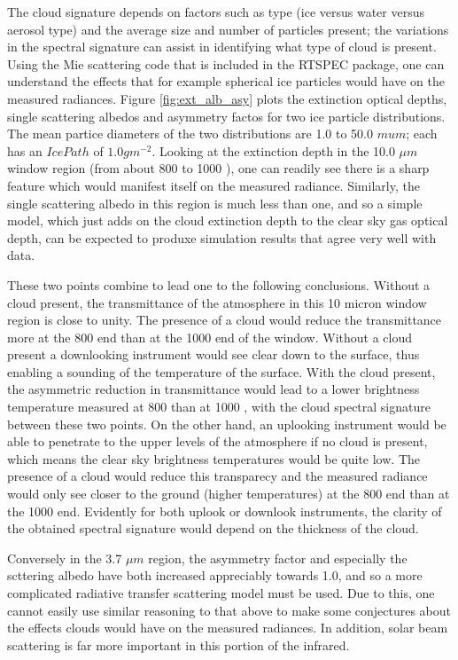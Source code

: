 \documentclass[11pt]{article}
\begin{document}
The cloud signature depends on factors such as type (ice versus water versus
aerosol type) and the average size and number of particles present; the 
variations in the spectral signature can assist in identifying what type 
of cloud is present. Using the Mie scattering code that is included in the 
\textsf{RTSPEC} package, one can understand the effects that for example 
spherical ice particles would have on the measured radiances. 
Figure \ref{fig:ext_alb_asy} plots the extinction 
optical depths, single scattering albedos and asymmetry factos for two 
ice particle distributions. The mean partice diameters of the two 
distributions are 1.0 to 50.0 $mu m$;  each has an $IcePath$ of 
$1.0 g m^{-2}$. Looking at the extinction depth in the 10.0 $\mu m$ window
region (from about 800 to 1000 \wn), one can readily see there is a sharp 
feature which would manifest itself on the measured radiance. Similarly, the 
single scattering albedo in this region is much less than one, and so a 
simple model, which just adds on the cloud extinction depth to the clear sky 
gas optical depth, can be expected to produxe simulation results that agree 
very well with data.  

These two points combine to lead one to the following conclusions. Without a 
cloud present, the transmittance of the atmosphere in this 10 micron window
region is close to unity. The presence of a cloud would reduce the 
transmittance more at the 800 \wn end than at the 1000 \wn end of the window.
Without a cloud present a downlooking instrument would see clear down to 
the surface, thus enabling a sounding of the temperature of the surface. With
the cloud present, the asymmetric reduction in transmittance would lead to a
lower brightness temperature measured at 800 \wn than at 1000 \wn, with the
cloud spectral signature between these two points. On the other hand, an
uplooking instrument would be able to penetrate to the upper levels of the
atmosphere if no cloud is present, which means the clear sky brightness 
temperatures would be quite low. The presence of a cloud would reduce this
transparecy and the measured radiance would only see closer to the ground 
(higher temperatures) at the 800 \wn end than at the 1000 \wn end. Evidently 
for both uplook or downlook instruments, the clarity of the obtained 
spectral signature would depend on the thickness of the cloud.

Conversely in the 3.7 $\mu m$ region, the asymmetry factor and especially 
the scttering albedo have both increased appreciably towards 1.0, and so a 
more complicated radiative transfer scattering model must be used. Due to
this, one cannot easily use similar reasoning to that above to make
some conjectures about the effects clouds would have on the measured 
radiances. In addition, solar beam scattering is far more important in this 
portion of the infrared.
\end{document}
